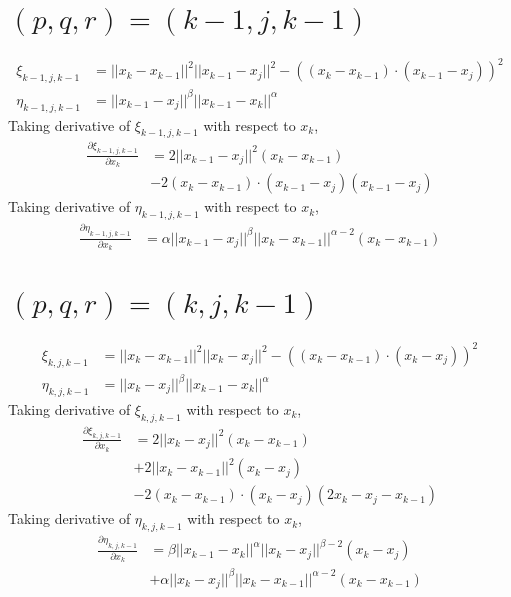 \documentclass[a4paper]{article}
\newcommand{\norm}[1]{||#1||}
\begin{document}
\section{$(p,q,r) = (k-1, j, k-1)$}
\begin{align}
    \xi_{k-1,j,k-1} &= \norm{x_k - x_{k-1}}^2 \norm{x_{k-1} - x_j}^2- \left( \left( x_k - x_{k-1} \right) \cdot \left( x_{k-1} - x_{j} \right) \right)^2 \\
    \eta_{k-1,j,k-1} &= \norm{x_{k-1} - x_j}^{\beta} \norm{x_{k-1} - x_k}^{\alpha}
\end{align}
Taking derivative of $\xi_{k-1, j, k-1}$ with respect to $x_k$,
\begin{align}
    \frac{\partial \xi_{k-1, j, k-1}}{\partial x_k} &= 2 \norm{x_{k-1} - x_j}^2 \left( x_k - x_{k-1} \right) \\
    &- 2 \left( x_k - x_{k-1} \right) \cdot \left( x_{k-1} - x_j \right) \left( x_{k-1} - x_j \right)
\end{align}
Taking derivative of $\eta_{k-1, j, k-1}$ with respect to $x_k$,
\begin{align}
    \frac{\partial \eta_{k-1, j, k-1}}{\partial x_k} &= \alpha \norm{x_{k-1} - x_j}^{\beta} \norm{x_k - x_{k-1}}^{\alpha-2} \left( x_k - x_{k-1} \right)
\end{align}
\section{$(p,q,r) = (k, j, k-1)$}
\begin{align}
    \xi_{k,j,k-1} &= \norm{x_{k} - x_{k-1}}^2 \norm{x_k - x_j}^2- \left( \left( x_{k} - x_{k-1} \right) \cdot \left( x_{k} - x_{j} \right) \right)^2 \\
    \eta_{k,j,k-1} &= \norm{x_k - x_j}^{\beta} \norm{x_{k-1} - x_{k}}^{\alpha}
\end{align}
Taking derivative of $\xi_{k, j, k-1}$ with respect to $x_k$,
\begin{align}
    \frac{\partial \xi_{k, j, k-1}}{\partial x_k} &= 2 \norm{x_k - x_j}^2 \left( x_k - x_{k-1} \right) \\
    &+ 2 \norm{x_k - x_{k-1}}^2 \left( x_k - x_j \right) \\
    &- 2 \left( x_k - x_{k-1} \right) \cdot \left( x_k - x_j \right) \left( 2 x_k - x_j - x_{k-1} \right)
\end{align}
Taking derivative of $\eta_{k, j, k-1}$ with respect to $x_k$,
\begin{align}
    \frac{\partial \eta_{k, j, k-1}}{\partial x_k} &= \beta \norm{x_{k-1} - x_k}^{\alpha} \norm{x_k - x_j}^{\beta - 2} \left( x_k - x_j \right) \\
    &+ \alpha \norm{x_k - x_j}^{\beta} \norm{x_k - x_{k-1}}^{\alpha - 2} \left( x_k - x_{k-1} \right)
\end{align}
\end{document}
